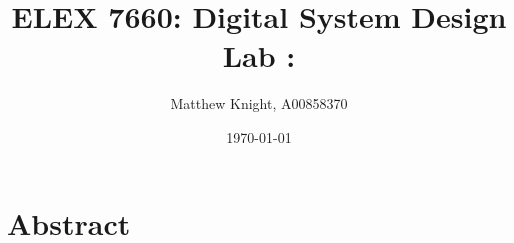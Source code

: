 \documentclass{article}
\title{	ELEX 7660: Digital System Design \\
	Lab \labNum: \labTitle}
\author{Matthew Knight, A00858370}
\date{\today}
\begin{document}
\clearpage
\maketitle
    \thispagestyle{empty}

\newpage
\section*{Abstract}
\end{document}
